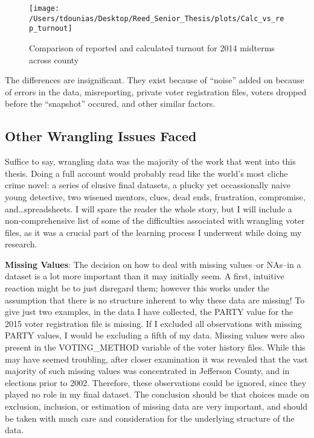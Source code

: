 \documentclass[12pt,twoside]{reedthesis}
\begin{document}
  \begin{figure}
  
  {\centering \texttt{[image: /Users/tdounias/Desktop/Reed\_Senior\_Thesis/plots/Calc\_vs\_rep\_turnout]} 
  
  }
  
  \caption[Comparison of reported and calculated turnout for 2014 midterms across county]{Comparison of reported and calculated turnout for 2014 midterms across county}\label{fig:comp turnout 2014}
  \end{figure}
  
  The differences are insignificant. They exist because of ``noise'' added
  on because of errors in the data, misreporting, private voter
  registration files, voters dropped before the ``snapshot'' occured, and
  other similar factors.
  
  \subsection{Other Wrangling Issues
  Faced}\label{other-wrangling-issues-faced}
  
  Suffice to say, wrangling data was the majority of the work that went
  into this thesis. Doing a full account would probably read like the
  world's most cliche crime novel: a series of elusive final datasets, a
  plucky yet occassionally naive young detective, two wisened mentors,
  clues, dead ends, frustration, compromise, and\ldots{}spreadsheets. I
  will spare the reader the whole story, but I will include a
  non-comprehensive list of some of the difficulties associated with
  wrangling voter files, as it was a crucial part of the learning process
  I underwent while doing my research.
  
  \textbf{Missing Values}: The decision on how to deal with missing
  values--or NAs--in a dataset is a lot more important than it may
  initially seem. A first, intuitive reaction might be to just disregard
  them; however this works under the assumption that there is no structure
  inherent to why these data are missing! To give just two examples, in
  the data I have collected, the PARTY value for the 2015 voter
  registration file is missing. If I excluded all observations with
  missing PARTY values, I would be excluding a fifth of my data. Missing
  values were also present in the VOTING\_METHOD variable of the voter
  history files. While this may have seemed troubling, after closer
  examination it was revealed that the vast majority of such missing
  values was concentrated in Jefferson County, and in elections prior to
  2002. Therefore, these observations could be ignored, since they played
  no role in my final dataset. The conclusion should be that choices made
  on exclusion, inclusion, or estimation of missing data are very
  important, and should be taken with much care and consideration for the
  underlying structure of the data.
  
\end{document}
